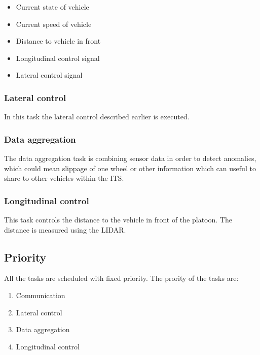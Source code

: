 \begin{itemize}
  \item Current state of vehicle
  \item Current speed of vehicle
  \item Distance to vehicle in front
  \item Longitudinal control signal
  \item Lateral control signal
\end{itemize}

\subsubsection{Lateral control}
In this task the lateral control described earlier is executed.
\subsubsection{Data aggregation}
The data aggregation task is combining sensor data in order to detect anomalies, which could mean slippage of one wheel or other information which can useful to share to other vehicles within the ITS.  
\subsubsection{Longitudinal control}
This task controls the distance to the vehicle in front of the platoon. The distance is measured using the LIDAR.\\
 

\subsection{Priority}
All the tasks are scheduled with fixed priority. The prority of the tasks are:

\begin{enumerate}
  \item Communication
  \item Lateral control
  \item Data aggregation
  \item Longitudinal control
\end{enumerate}




